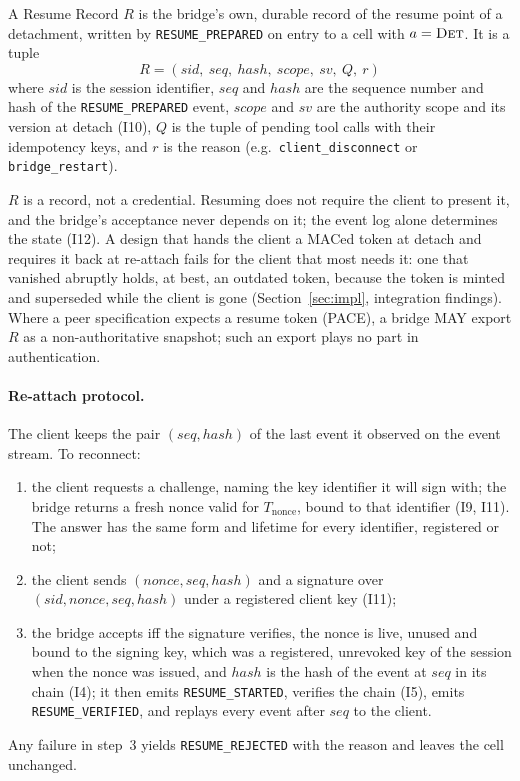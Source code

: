 \begin{definition}\label{def:rt}
A Resume Record $R$ is the bridge's own, durable record of the resume
point of a detachment, written by \texttt{RESUME\_PREPARED} on entry to
a cell with $a=\textsc{Det}$. It is a tuple
\[
R = (\mathit{sid},\ \mathit{seq},\ \mathit{hash},\ \mathit{scope},\ \mathit{sv},\ Q,\ r)
\]
where $\mathit{sid}$ is the session identifier, $\mathit{seq}$ and
$\mathit{hash}$ are the sequence number and hash of the
\texttt{RESUME\_PREPARED} event, $\mathit{scope}$ and $\mathit{sv}$ are
the authority scope and its version at detach (I10), $Q$ is the tuple of
pending tool calls with their idempotency keys, and $r$ is the reason
(e.g.\ \texttt{client\_disconnect} or \texttt{bridge\_restart}).
\end{definition}

$R$ is a record, not a credential. Resuming does not require the client
to present it, and the bridge's acceptance never depends on it; the
event log alone determines the state (I12). A design that hands the
client a MACed token at detach and requires it back at re-attach
fails for the client that most needs it: one that vanished abruptly
holds, at best, an outdated token, because the token is minted and
superseded while the client is gone (Section~\ref{sec:impl}, integration findings).
Where a peer specification expects a resume token (PACE), a bridge MAY
export $R$ as a non-authoritative snapshot; such an export plays no part
in authentication.

\paragraph{Re-attach protocol.} The client keeps the pair
$(\mathit{seq}, \mathit{hash})$ of the last event it observed on the
event stream. To reconnect:
\begin{enumerate}[leftmargin=2em]
\item the client requests a challenge, naming the key identifier it will
sign with; the bridge returns a fresh nonce valid for $T_{\text{nonce}}$,
bound to that identifier (I9, I11). The answer has the same form and
lifetime for every identifier, registered or not;
\item the client sends $(\mathit{nonce}, \mathit{seq}, \mathit{hash})$ and
a signature over $(\mathit{sid}, \mathit{nonce}, \mathit{seq},
\mathit{hash})$ under a registered client key (I11);
\item the bridge accepts iff the signature verifies, the nonce is live,
unused and bound to the signing key, which was a registered, unrevoked key of
the session when the nonce was issued, and $\mathit{hash}$ is the hash of the event at
$\mathit{seq}$ in its chain (I4); it then emits \texttt{RESUME\_STARTED},
verifies the chain (I5), emits \texttt{RESUME\_VERIFIED}, and replays
every event after $\mathit{seq}$ to the client.
\end{enumerate}
Any failure in step~3 yields \texttt{RESUME\_REJECTED} with the reason
and leaves the cell unchanged.

